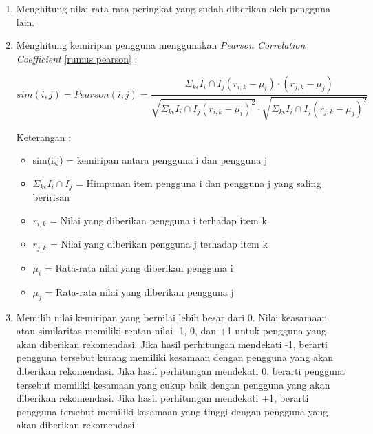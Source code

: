 \begin{enumerate}
	\item Menghitung nilai rata-rata peringkat yang sudah diberikan oleh pengguna lain.
	
	\item Menghitung kemiripan pengguna menggunakan \textit{Pearson Correlation Coefficient} \cite{buku:sistem:rekomendasi} \ref{rumus pearson} :
	
	\begin{equation}
		sim(i,j) = Pearson(i,j) = \frac{\Sigma _{k\epsilon} I_{i} \cap I_{j} (r_{i,k}-\mu_{i}) \cdot (r_{j,k}-\mu_{j})}{\sqrt{\Sigma _{k\epsilon} I_{i} \cap I_{j} (r_{i,k}-\mu_{i})^2} \cdot \sqrt{\Sigma _{k\epsilon} I_{i} \cap I_{j} (r_{j,k}-\mu_{j})^2 }}
		\label{rumus pearson}
	\end{equation}
	
	Keterangan : 
	\begin{itemize}
		\item sim(i,j) = kemiripan antara pengguna i dan pengguna j
		
		\item $\Sigma _{k\epsilon} I_{i} \cap I_{j}$ = Himpunan item pengguna i dan pengguna j yang saling beririsan
		
		\item $r_{i,k}$ = Nilai yang diberikan pengguna i terhadap item k
		
		\item $r_{j,k}$ = Nilai yang diberikan pengguna j terhadap item k
		
		\item $\mu_{i}$ = Rata-rata nilai yang diberikan pengguna i
		
		\item $\mu_{j}$ = Rata-rata nilai yang diberikan pengguna j
	\end{itemize}\leavevmode
	
	\item Memilih nilai kemiripan yang bernilai lebih besar dari 0. Nilai keasamaan atau similaritas memiliki rentan nilai -1, 0, dan +1 untuk pengguna yang akan diberikan rekomendasi. Jika hasil perhitungan mendekati -1, berarti pengguna tersebut kurang memiliki kesamaan dengan pengguna yang akan diberikan rekomendasi. Jika hasil perhitungan mendekati 0, berarti pengguna tersebut memiliki kesamaan yang cukup baik dengan pengguna yang akan diberikan rekomendasi. Jika hasil perhitungan mendekati +1, berarti pengguna tersebut memiliki kesamaan yang tinggi dengan pengguna yang akan diberikan rekomendasi.
	

\end{enumerate}

